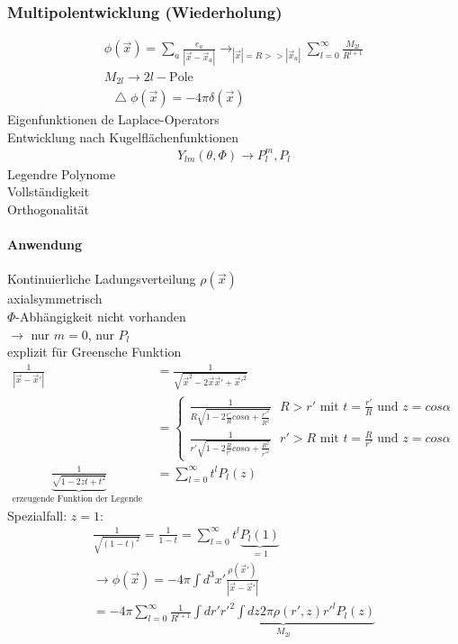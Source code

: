 \documentclass[a4paper]{article}
\newcommand*\laplace{\mathop{}\!\mathbin\bigtriangleup}
\begin{document}
\subsubsection{Multipolentwicklung (Wiederholung)}
\begin{align}
\phi(\vec{x})=\sum_a\frac{e_a}{|\vec{x}-\vec{x}_a|}
\rightarrow_{|\vec{x}|=R>>|\vec{x}_a|} \sum^\infty_{l=0}\frac{M_{2l}}{R^{l+1}}\\
M_{2l}\rightarrow2l-\text{Pole}\\
\laplace\phi(\vec{x})=-4\pi\delta(\vec{x})
\end{align}
Eigenfunktionen de Laplace-Operators\\
Entwicklung nach Kugelflächenfunktionen
\begin{align}
Y_{lm}(\theta,\Phi)\rightarrow P_l^m,P_l
\end{align}
Legendre Polynome\\
Vollständigkeit\\
Orthogonalität\\
\paragraph{Anwendung}
Kontinuierliche Ladungsverteilung $\rho(\vec{x})$\\
axialsymmetrisch\\
$\Phi$-Abhängigkeit nicht vorhanden\\
$\rightarrow$ nur $m=0$, nur $P_l$\\
explizit für Greensche Funktion
\begin{align}
\frac{1}{|\vec{x}-\vec{x}'|}&=\frac{1}{\sqrt{\vec{x}^2-2\vec{x}\vec{x}'+\vec{x}'^2}}\\
&=\begin{cases}\frac{1}{R\sqrt{1-2\frac{r'}{R}cos\alpha+\frac{r'^2}{R^2}}}
\text{  } R>r' \text{ mit } t=\frac{r'}{R} \text { und }z=cos\alpha\\
\frac{1}{r'\sqrt{1-2\frac{R}{r'}cos\alpha+\frac{R^2}{r'^2}}} \text{  } r'>R
\text{ mit } t=\frac{R}{r'} \text { und }z=cos\alpha\end{cases}\\
\underbrace{\frac{1}{\sqrt{1-2zt+t^2}}}_{\text{erzeugende
Funktion der Legende Polynome}}&=\sum^\infty_{l=0}t^l P_l(z)
\end{align}
Spezialfall: $z=1$:
\begin{align}
\frac{1}{\sqrt{(1-t)^2}}=\frac{1}{1-t}=\sum^\infty_{l=0}t^l
\underbrace{P_l(1)}_{=1}\\
\rightarrow
\phi(\vec{x})=-4\pi\int d^3x'\frac{\rho(\vec{x}')}{|\vec{x}-\vec{x}'|}\\
=-4\pi\sum^\infty_{l=0}\frac{1}{R^{l+1}}\underbrace{\int dr' r'^2\int dz 2\pi
\rho(r',z)r'^l P_l(z)}_{M_{2l}}
\end{align}
\end{document}
